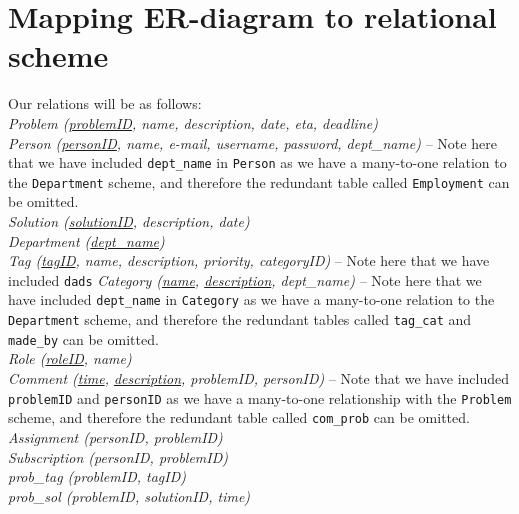 \section{Mapping ER-diagram to relational scheme}
\label{sec:map_er_rel}

Our relations will be as follows:\\

\noindent \textit{Problem (\underline{problemID}, name, description, date, eta, deadline)} \\
\textit{Person (\underline{personID}, name, e-mail, username, password, dept\_name)}  -- Note here that we have included \verb+dept_name+ in \verb+Person+ as we have a many-to-one relation to the \verb+Department+ scheme, and therefore the redundant table called \verb+Employment+ can be omitted.\\
\textit{Solution (\underline{solutionID}, description, date)} \\
\textit{Department (\underline{dept\_name})} \\
\textit{Tag (\underline{tagID}, name, description, priority, categoryID)} -- Note here that we have included \verb+dads+
\textit{Category (\underline{name}, \underline{description}, dept\_name)} -- Note here that we have included \verb+dept_name+ in \verb+Category+ as we have a many-to-one relation to the \verb+Department+ scheme, and therefore the redundant tables called \verb+tag_cat+ and \verb+made_by+ can be omitted.\\
\textit{Role (\underline{roleID}, name)} \\
\textit{Comment (\underline{time}, \underline{description}, problemID, personID)} -- Note that we have included \verb+problemID+ and \verb+personID+ as we have a many-to-one relationship with the \verb+Problem+ scheme, and therefore the redundant table called \verb+com_prob+ can be omitted.\\
\textit{Assignment (personID, problemID)} \\
\textit{Subscription (personID, problemID)} \\
\textit{prob\_tag (problemID, tagID)} \\
\textit{prob\_sol (problemID, solutionID, time)} \\